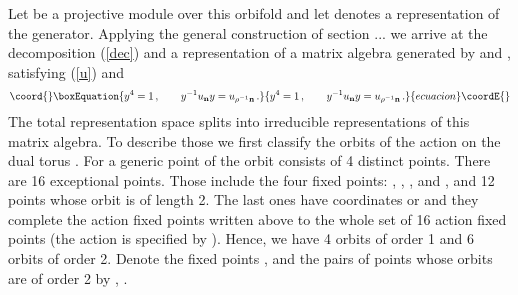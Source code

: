 \documentclass[a4paper,a4paper]{article}
\begin{document}
{Let \coordHE{} be a projective module over this orbifold and 
  let \coordHE{} denotes a representation of the \coordHE{} generator.  
Applying  the general construction of section ... we arrive at the decomposition (\ref{dec}) and a representation of 
a matrix algebra generated by \coordHE{} and \coordHE{}, satisfying (\ref{u}) and 
\begin{equation}\coord{}\boxEquation{ \label{y}
y^{4} = 1 \, , \qquad y^{-1}u_{\bf n}y = u_{\rho^{-1}{\bf n}} \, . 
}{ y^{4} = 1 \, , \qquad y^{-1}u_{\bf n}y = u_{\rho^{-1}{\bf n}} \, . 
}{ecuacion}\coordE{}\end{equation}
The total representation space \coordHE{} splits into irreducible representations of this matrix algebra. 
To describe those we first classify  the orbits of the \coordHE{}  action \myHighlight{$\rho^{*}$}\coordHE{} on the dual torus \coordHE{}. 
For a generic point of  \coordHE{} the orbit consists of 4 distinct points. 
There are 16 exceptional points. Those include the four fixed points: \coordHE{}, \coordHE{}, \coordHE{}, and \coordHE{},  and 
 12 points whose orbit is of length 2. The last ones  have coordinates \coordHE{} or \coordHE{} and they complete the \coordHE{} 
action fixed points written above to the whole set of 16 \coordHE{} action fixed points (the  \coordHE{} action is specified  by \coordHE{}).  
Hence, we have 4 orbits of order 1 and 6 orbits of order 2. Denote the fixed points \myHighlight{$\Lambda_{\epsilon}$}\coordHE{}, \coordHE{} 
and the pairs of points whose orbits are of order 2 by \coordHE{}, \coordHE{}. 


}
\end{document}
